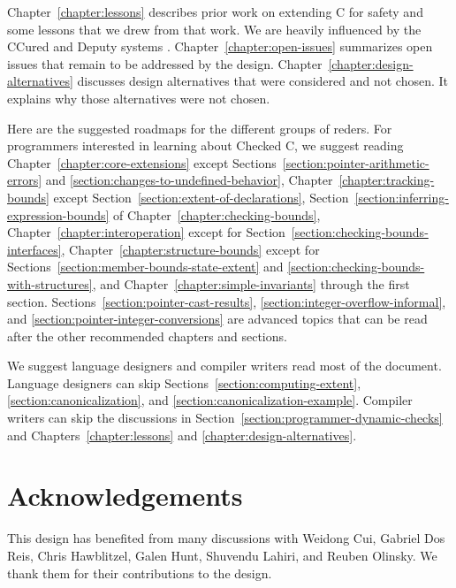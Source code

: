 Chapter~\ref{chapter:lessons} describes prior work on extending C for safety and some
lessons that we drew from that work. We are heavily influenced by the
CCured \cite{Necula2005} and Deputy systems \cite{Feng2006,Condit2007}.
Chapter~\ref{chapter:open-issues} summarizes open issues that remain to be addressed
by the design.
Chapter~\ref{chapter:design-alternatives} discusses design alternatives
that were considered and not chosen.  It explains why those alternatives were
not chosen.

Here are the suggested roadmaps for the different groups of reders.
For programmers interested in learning about Checked C, 
we suggest reading Chapter~\ref{chapter:core-extensions} except 
Sections~\ref{section:pointer-arithmetic-errors} and \ref{section:changes-to-undefined-behavior},
Chapter~\ref{chapter:tracking-bounds}
except Section~\ref{section:extent-of-declarations}, 
Section~\ref{section:inferring-expression-bounds} of Chapter~\ref{chapter:checking-bounds},
Chapter~\ref{chapter:interoperation} except for Section~\ref{section:checking-bounds-interfaces},
Chapter~\ref{chapter:structure-bounds} except for Sections~\ref{section:member-bounds-state-extent}
and \ref{section:checking-bounds-with-structures},
and Chapter~\ref{chapter:simple-invariants} through the first section.  
Sections~\ref{section:pointer-cast-results},  \ref{section:integer-overflow-informal},
and \ref{section:pointer-integer-conversions} are advanced topics that can be read
after the other recommended chapters and sections.

We suggest language designers and compiler writers 
read most of the document. Language designers can skip Sections~\ref{section:computing-extent},
\ref{section:canonicalization}, and \ref{section:canonicalization-example}.
Compiler writers can skip the discussions in Section~\ref{section:programmer-dynamic-checks}
and Chapters~\ref{chapter:lessons} and \ref{chapter:design-alternatives}.

\section{Acknowledgements}

This design has benefited from many discussions with Weidong Cui, Gabriel Dos Reis, 
Chris Hawblitzel, Galen Hunt, Shuvendu Lahiri, and Reuben Olinsky.  We thank them 
for their contributions to the design.


